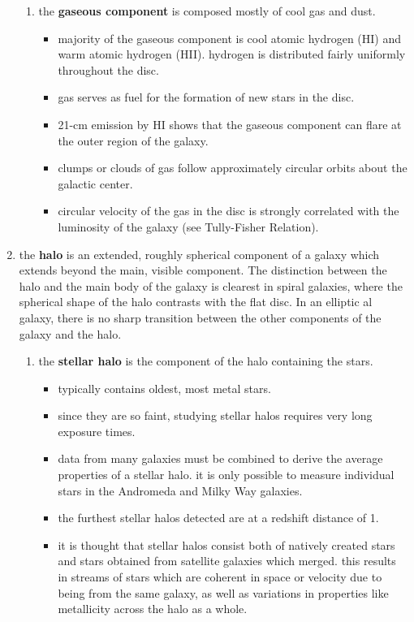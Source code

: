 \begin{enumerate}
\begin{enumerate}
			\item the \textbf{gaseous component} is composed mostly of cool gas and dust.
				\begin{itemize}[noitemsep]
					\item majority of the gaseous component is cool atomic hydrogen (HI) and warm atomic hydrogen (HII). hydrogen is distributed fairly uniformly throughout the disc.
					\item gas serves as fuel for the formation of new stars in the disc.
					\item 21-cm emission by HI shows that the gaseous component can flare at the outer region of the galaxy.
					\item clumps or clouds of gas follow approximately circular orbits about the galactic center.
					\item circular velocity of the gas in the disc is strongly correlated with the luminosity of the galaxy (see Tully-Fisher Relation).
				\end{itemize}
		\end{enumerate}
	\item the \textbf{halo} is an extended, roughly spherical component of a galaxy which extends beyond the main, visible component. The distinction between the halo and the main body of the galaxy is clearest in spiral galaxies, where the spherical shape of the halo contrasts with the flat disc. In an elliptic al galaxy, there is no sharp transition between the other components of the galaxy and the halo.
		\begin{enumerate}
			\item the \textbf{stellar halo} is the component of the halo containing the stars.
				\begin{itemize}[noitemsep]
					\item typically contains oldest, most metal stars.
					\item since they are so faint, studying stellar halos requires very long exposure times.
					\item data from many galaxies must be combined to derive the average properties of a stellar halo. it is only possible to measure individual stars in the Andromeda and Milky Way galaxies.
					\item the furthest stellar halos detected are at a redshift distance of 1.
					\item it is thought that stellar halos consist both of natively created stars and stars obtained from satellite galaxies which merged. this results in streams of stars which are coherent in space or velocity due to being from the same galaxy, as well as variations in properties like metallicity across the halo as a whole.

\end{itemize}
\end{enumerate}
\end{enumerate}
